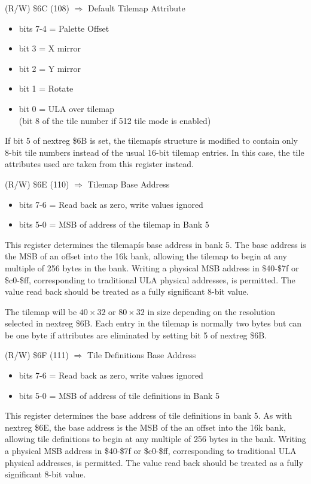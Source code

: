 (R/W) \$6C (108) $\Rightarrow$ Default Tilemap Attribute
\begin{itemize}
\item[] bits 7-4 = Palette Offset
\item[] bit 3    = X mirror
\item[] bit 2    = Y mirror
\item[] bit 1    = Rotate
\item[] bit 0    = ULA over tilemap\\
  (bit 8 of the tile number if 512 tile mode is enabled)
\end{itemize}

If bit 5 of nextreg \$6B is set, the tilemapís structure is modified
to contain only 8-bit tile numbers instead of the usual 16-bit tilemap
entries. In this case, the tile attributes used are taken from this
register instead.

(R/W) \$6E (110) $\Rightarrow$ Tilemap Base Address
\begin{itemize}
\item[] bits 7-6 = Read back as zero, write values ignored
\item[] bits 5-0 = MSB of address of the tilemap in Bank 5
\end{itemize}

This register determines the tilemapís base address in bank 5. The
base address is the MSB of an offset into the 16k bank, allowing the
tilemap to begin at any multiple of 256 bytes in the bank. Writing a
physical MSB address in \$40-\$7f or \$c0-\$ff, corresponding to
traditional ULA physical addresses, is permitted. The value read back
should be treated as a fully significant 8-bit value.

The tilemap will be $40\times32$ or $80\times32$ in size depending on
the resolution selected in nextreg \$6B. Each entry in the tilemap is
normally two bytes but can be one byte if attributes are eliminated by
setting bit 5 of nextreg \$6B.

(R/W) \$6F (111) $\Rightarrow$ Tile Definitions Base Address
\begin{itemize}
\item[] bits 7-6 = Read back as zero, write values ignored
\item[] bits 5-0 = MSB of address of tile definitions in Bank 5
\end{itemize}

This register determines the base address of tile definitions in bank
5. As with nextreg \$6E, the base address is the MSB of the an offset
into the 16k bank, allowing tile definitions to begin at any multiple
of 256 bytes in the bank. Writing a physical MSB address in \$40-\$7f
or \$c0-\$ff, corresponding to traditional ULA physical addresses, is
permitted. The value read back should be treated as a fully
significant 8-bit value.

